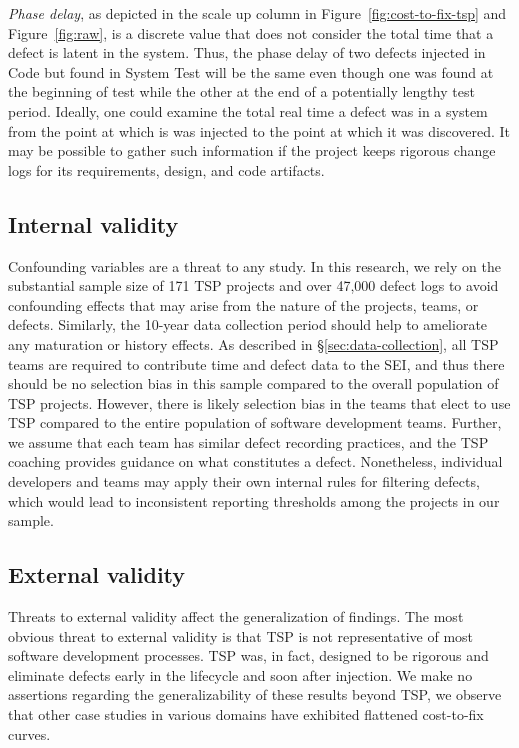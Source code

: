 \documentclass{sig-alternate}
\newcommand{\fig}[1]{Figure~\ref{fig:#1}}
\begin{document}
\emph{Phase delay}, as depicted in the scale up column in \fig{cost-to-fix-tsp} and \fig{raw}, is a discrete value that does not consider the total time that a defect is latent in the system. Thus, the phase delay of two defects injected in Code but found in System Test will be the same even though one was found at the beginning of test while the other at the end of a potentially lengthy test period. Ideally, one could examine the total real time a defect was in a system from the point at which is was injected to the point at which it was discovered. It may be possible to gather such information if the project keeps rigorous change logs for its requirements, design, and code artifacts. 

\subsection{Internal validity}
Confounding variables are a threat to any study. In this research, we rely on the substantial sample size of 171 TSP projects and over 47,000 defect logs to avoid confounding effects that may arise from the nature of the projects, teams, or defects. Similarly, the 10-year data collection period should help to ameliorate any maturation or history effects.  As described in \S\ref{sec:data-collection}, all TSP teams are required to contribute time and defect data to the SEI, and thus there should be no selection bias in this sample compared to the overall population of TSP projects. However, there is likely selection bias in the teams that elect to use TSP compared to the entire population of software development teams. Further, we assume that each team has similar defect recording practices, and the TSP coaching provides guidance on what constitutes a defect. Nonetheless, individual developers and teams may apply their own internal rules for filtering defects, which would lead to inconsistent reporting thresholds among the projects in our sample.

\subsection{External validity}
Threats to external validity affect the generalization of findings. The most obvious threat to external validity is that TSP is not representative of most software development processes. TSP was, in fact, designed to be rigorous and eliminate defects early in the lifecycle and soon after injection. We make no assertions regarding the generalizability of these results beyond TSP, we observe that other case studies in various domains have exhibited flattened cost-to-fix curves.
\end{document}

